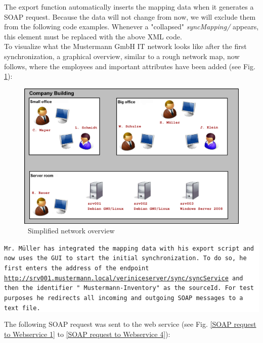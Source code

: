 \documentclass[a4paper,10pt]{book}
\begin{document}
The export function automatically inserts the mapping data when it generates a SOAP request. Because the data
will not change from now, we will exclude them from the following code examples. Whenever a "collapsed"
\textit{syncMapping/} appears, this element must be replaced with the above XML code.
\newline\\
To visualize what the Mustermann GmbH IT network looks like after the first synchronization, a graphical overview,
similar to a rough network map, now follows, where the employees and important attributes have been added (see Fig. \ref{Simplified network overview}):
\newline
\begin{figure}[htb!]
  \centering
  \includegraphics[scale=.205]{Screenshot/Mustermann_snapshot01_03-en.png}
  \caption{\label{Simplified network overview} \ Simplified network overview}
\end{figure}
\newline
\colorbox{white}{\parbox{\textwidth}{
{\tt Mr. Müller has integrated the mapping data with his export script and now uses the GUI to start the initial synchronization.
To do so, he first enters the address of the endpoint
\newline
\href{http://srv001.mustermann.local/veriniceserver/sync/syncService}{http://srv001.mustermann.local/veriniceserver/sync/syncService}
\newline
and then the identifier " Mustermann-Inventory" as the sourceId. For test purposes he redirects all incoming and outgoing SOAP messages to a text file.}
}}
\newline\newline
The following SOAP request was sent to the web service (see Fig. \ref{SOAP request to Webservice 1} to \ref{SOAP request to Webservice 4}):
\end{document}
